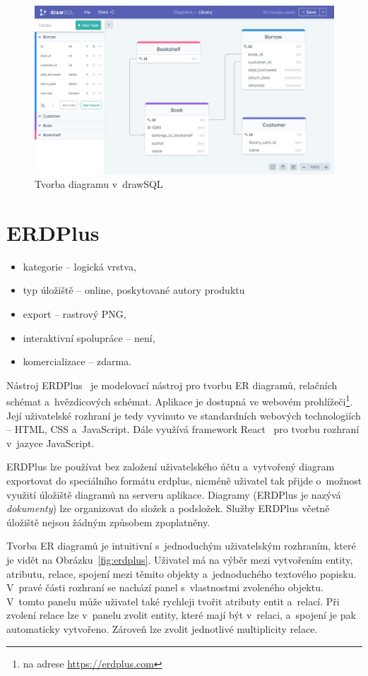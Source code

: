 \begin{figure}
  \centering
  \includegraphics[width = \textwidth]{../img/drawsql.png}
  \caption{Tvorba diagramu v~drawSQL}
  \label{fig:drawsql}
\end{figure}

\section{ERDPlus}
\begin{itemize}
  \item kategorie -- logická vrstva,
  \item typ úložiště -- online, poskytované autory produktu
  \item export -- rastrový PNG,
  \item interaktivní spolupráce -- není,
  \item komercializace -- zdarma.
\end{itemize}

Nástroj ERDPlus~\cite{erdplus_2023} je modelovací nástroj pro tvorbu ER diagramů, relačních schémat a~hvězdicových schémat.
Aplikace je dostupná ve webovém prohlížeči\footnote{na adrese \url{https://erdplus.com}}.
Její uživatelské rozhraní je tedy vyvinuto ve standardních webových technologiích -- HTML, CSS a~JavaScript.
Dále využívá framework React~\cite{react_2023} pro tvorbu rozhraní v~jazyce JavaScript.

ERDPlus lze používat bez založení uživatelského účtu a~vytvořený diagram exportovat do speciálního formátu erdplus, nicméně uživatel tak přijde o~možnost využití úložiště diagramů na serveru aplikace.
Diagramy (ERDPlus je nazývá \emph{dokumenty}) lze organizovat do složek a podsložek.
Služby ERDPlus včetně úložiště nejsou žádným způsobem zpoplatněny.

Tvorba ER diagramů je intuitivní s~jednoduchým uživatelským rozhraním, které je vidět na Obrázku~\ref{fig:erdplus}.
Uživatel má na výběr mezi vytvořením entity, atributu, relace, spojení mezi těmito objekty a~jednoduchého textového popisku.
V~pravé části rozhraní se nachází panel s~vlastnostmi zvoleného objektu.
V~tomto panelu může uživatel také rychleji tvořit atributy entit a~relací.
Při zvolení relace lze v~panelu zvolit entity, které mají být v~relaci, a~spojení je pak automaticky vytvořeno.
Zároveň lze zvolit jednotlivé multiplicity relace.

